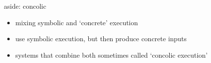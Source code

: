 \begin{frame}{aside: concolic}
    \begin{itemize}
    \item mixing symbolic and `concrete' execution
    \item use symbolic execution, but then produce concrete inputs
    \vspace{.5cm}
    \item systems that combine both sometimes called `concolic execution'
    \end{itemize}
\end{frame}

